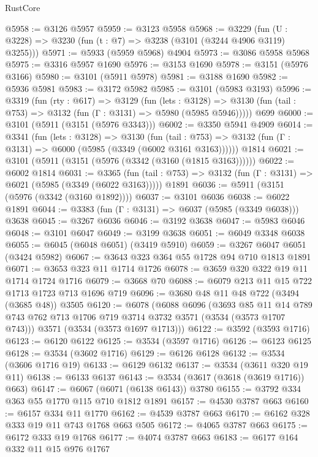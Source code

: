 \begin{lexlean}{RustCore}
\begin{coremodule}
@5958 := @3126 @5957
@5959 := @3123 @5958
@5968 := @3229 (fun (U : @3228) => @3230 (fun (t : @7) => @3238 (@3101 (@3244 @4906 @3119) @3255)))
@5971 := @5933 (@5959 @5968) @4904
@5973 := @3086 @5958 @5968
@5975 := @3316 @5957 @1690
@5976 := @3153 @1690
@5978 := @3151 (@5976 @3166)
@5980 := @3101 (@5911 @5978)
@5981 := @3188 @1690
@5982 := @5936 @5981
@5983 := @3172 @5982
@5985 := @3101 (@5983 @3193)
@5996 := @3319
    (fun (rty : @617) =>
    @3129
      (fun (lets : @3128) =>
      @3130 (fun (tail : @753) => @3132 (fun (Γ : @3131) => @5980 (@5985 @5946)))))
    @699
@6000 := @3101 (@5911 (@3151 (@5976 @3343)))
@6002 := @3350 @5941 @4909
@6014 := @3341
    (fun (lets : @3128) =>
    @3130
      (fun (tail : @753) => @3132 (fun (Γ : @3131) => @6000 (@5985 (@3349 (@6002 @3161 @3163))))))
    @1814
@6021 := @3101 (@5911 (@3151 (@5976 (@3342 (@3160 (@1815 @3163))))))
@6022 := @6002 @1814
@6031 := @3365
    (fun (tail : @753) => @3132 (fun (Γ : @3131) => @6021 (@5985 (@3349 (@6022 @3163)))))
    @1891
@6036 := @5911 (@3151 (@5976 (@3342 (@3160 @1892))))
@6037 := @3101 @6036
@6038 := @6022 @1891
@6044 := @3383 (fun (Γ : @3131) => @6037 (@5985 (@3349 @6038))) @3638
@6045 := @3267 @6036
@6046 := @3192 @3638
@6047 := @5983 @6046
@6048 := @3101 @6047
@6049 := @3199 @3638
@6051 := @6049 @3348 @6038
@6055 := @6045 (@6048 @6051) (@3419 @5910)
@6059 := @3267 @6047 @6051 (@3424 @5982)
@6067 := @3643 @323 @364 @55 @1728 @94 @710 @1813 @1891
@6071 := @3653 @323 @11 @1714 @1726
@6078 := @3659 @320 @322 @19 @11 @1714 @1724 @1716
@6079 := @3668 @70
@6088 := @6079 @213 @11 @15 @722 @1713 @1723 @713 @1696 @719
@6096 := @3680 @48 @11 @48 @722 (@3494 (@3685 @48)) @3505
@6120 := @6078
    (@6088
      @6096
      (@3693
        @85
        @11
        @14
        @789
        @743
        @762
        @713
        @1706
        @719
        @3714
        @3732
        @3571
        (@3534 (@3573 @1707 @743)))
      @3571
      (@3534 (@3573 @1697 @1713)))
@6122 := @3592 (@3593 @1716)
@6123 := @6120 @6122
@6125 := @3534 (@3597 @1716)
@6126 := @6123 @6125
@6128 := @3534 (@3602 @1716)
@6129 := @6126 @6128
@6132 := @3534 (@3606 @1716 @19)
@6133 := @6129 @6132
@6137 := @3534 (@3611 @320 @19 @11)
@6138 := @6133 @6137
@6143 := @3534 (@3617 (@3618 (@3619 @1716)) @663)
@6147 := @6067 (@6071 (@6138 @6143)) @3780
@6155 := @3792 @334 @363 @55 @1770 @115 @710 @1812 @1891
@6157 := @4530 @3787 @663
@6160 := @6157 @334 @11 @1770
@6162 := @4539 @3787 @663
@6170 := @6162 @328 @333 @19 @11 @743 @1768 @663 @505
@6172 := @4065 @3787 @663
@6175 := @6172 @333 @19 @1768
@6177 := @4074 @3787 @663
@6183 := @6177 @164 @332 @11 @15 @976 @1767

\end{coremodule}
\end{lexlean}
